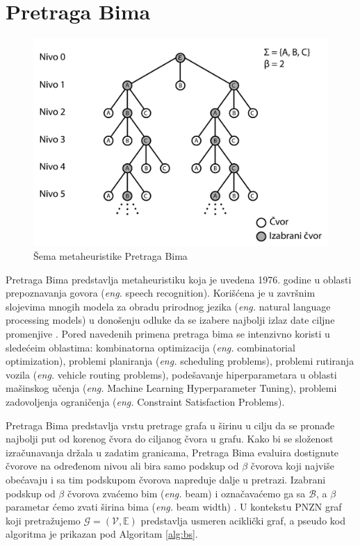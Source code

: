 \documentclass[12pt,oneside]{memoir}
\begin{document}
\section{Pretraga Bima}
\label{sec:pretragaBima}
\begin{figure}[!ht]
  \centering
  \includegraphics[width=1\textwidth]{Slike/bs1.png}
  \caption{Šema metaheuristike Pretraga Bima} 
  \label{fig:pretragaBima}
\end{figure}
Pretraga Bima predstavlja metaheuristiku koja je uvedena 1976. godine u oblasti prepoznavanja govora
(\textit{eng.} speech recognition). Korišćena je u završnim slojevima mnogih modela za
obradu prirodnog jezika (\textit{eng.} natural language processing models) u donošenju odluke da se izabere najbolji
izlaz date ciljne promenjive \cite{BSIntroduction}. Pored navedenih primena pretraga bima se intenzivno koristi u sledećeim
oblastima: kombinatorna optimizacija (\textit{eng.} combinatorial optimization), problemi planiranja (\textit{eng.} scheduling problems),
problemi rutiranja vozila (\textit{eng.} vehicle routing problems), podešavanje hiperparametara u oblasti mašinskog učenja
(\textit{eng.} Machine Learning Hyperparameter Tuning), problemi zadovoljenja ograničenja (\textit{eng.} Constraint Satisfaction Problems). 

Pretraga Bima predstavlja vrstu pretrage grafa u širinu u cilju da
se pronađe najbolji put od korenog čvora do ciljanog čvora u grafu. Kako bi se složenost izračunavanja držala u
zadatim granicama, Pretraga Bima evaluira dostignute čvorove na određenom nivou ali bira samo podskup od $\beta$
čvorova koji najviše obećavaju i sa tim podskupom čvorova napreduje dalje u pretrazi. Izabrani podskup od $\beta$ čvorova
zvaćemo bim (\textit{eng.} beam) i označavaćemo ga sa $\mathcal{B}$, a $\beta$ parametar ćemo zvati širina bima (\textit{eng.} beam width) \cite{SCSBS}.
U kontekstu PNZN graf koji pretražujemo $\mathcal{G}=(\mathcal{V},\mathbb{E})$ predstavlja usmeren aciklički graf, 
a pseudo kod algoritma je prikazan pod Algoritam \ref{alg:bs}.
\end{document}
